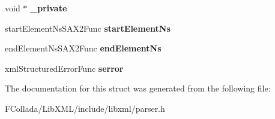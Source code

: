 \begin{DoxyCompactItemize}
\item 
\hypertarget{struct__xmlSAXHandler_a0206a8d061b3e408ec22ead7003a2c7a}{
void $\ast$ {\bfseries \_\-private}}
\label{struct__xmlSAXHandler_a0206a8d061b3e408ec22ead7003a2c7a}

\item 
\hypertarget{struct__xmlSAXHandler_a62aaeb317e06a20f32b90f105003e45a}{
startElementNsSAX2Func {\bfseries startElementNs}}
\label{struct__xmlSAXHandler_a62aaeb317e06a20f32b90f105003e45a}

\item 
\hypertarget{struct__xmlSAXHandler_ac5d1d80f714269f30425206428c2675e}{
endElementNsSAX2Func {\bfseries endElementNs}}
\label{struct__xmlSAXHandler_ac5d1d80f714269f30425206428c2675e}

\item 
\hypertarget{struct__xmlSAXHandler_ae022c0ff2961999df734b58fc0832338}{
xmlStructuredErrorFunc {\bfseries serror}}
\label{struct__xmlSAXHandler_ae022c0ff2961999df734b58fc0832338}

\end{DoxyCompactItemize}


The documentation for this struct was generated from the following file:\begin{DoxyCompactItemize}
\item 
FCollada/LibXML/include/libxml/parser.h\end{DoxyCompactItemize}
